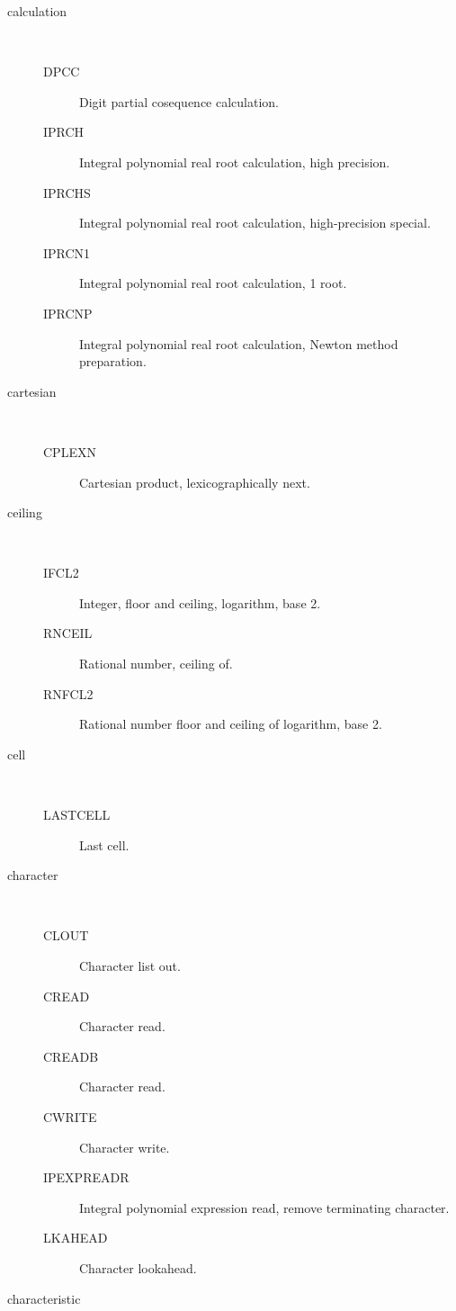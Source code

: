 \begin{description}
\begin{description}
  \end{description}
\item[calculation] \ \ 
  \begin{description}
  \item[DPCC]  Digit partial cosequence calculation.
  \item[IPRCH]  Integral polynomial real root calculation, high precision.
  \item[IPRCHS]  Integral polynomial real root calculation, high-precision
    special.
  \item[IPRCN1]  Integral polynomial real root calculation, 1 root.
  \item[IPRCNP]  Integral polynomial real root calculation, Newton method
    preparation.
  \end{description}
\item[cartesian] \ \ 
  \begin{description}
  \item[CPLEXN]  Cartesian product, lexicographically next.
  \end{description}
\item[ceiling] \ \ 
  \begin{description}
  \item[IFCL2]  Integer, floor and ceiling, logarithm, base 2.
  \item[RNCEIL]  Rational number, ceiling of.
  \item[RNFCL2]  Rational number floor and ceiling of logarithm, base 2.
  \end{description}
\item[cell] \ \ 
  \begin{description}
  \item[LASTCELL]  Last cell.
  \end{description}
\item[character] \ \ 
  \begin{description}
  \item[CLOUT]  Character list out.
  \item[CREAD]  Character read.
  \item[CREADB]  Character read.
  \item[CWRITE]  Character write.
  \item[IPEXPREADR]  Integral polynomial expression read, remove terminating
    character.
  \item[LKAHEAD]  Character lookahead.
  \end{description}
\item[characteristic] \ \ 
  \begin{description}

\end{description}
\end{description}
